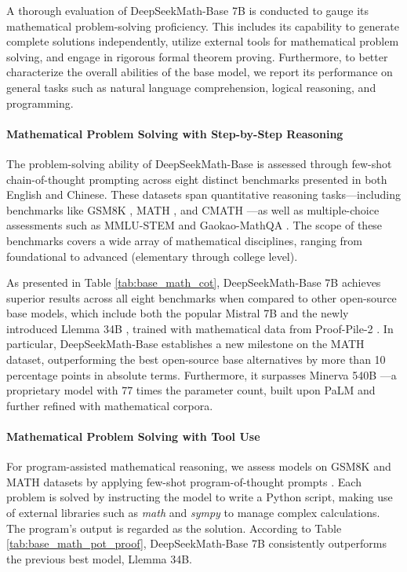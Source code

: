 A thorough evaluation of DeepSeekMath-Base 7B is conducted to gauge its mathematical problem-solving proficiency. This includes its capability to generate complete solutions independently, utilize external tools for mathematical problem solving, and engage in rigorous formal theorem proving. Furthermore, to better characterize the overall abilities of the base model, we report its performance on general tasks such as natural language comprehension, logical reasoning, and programming.

\paragraph{Mathematical Problem Solving with Step-by-Step Reasoning}

The problem-solving ability of DeepSeekMath-Base is assessed through few-shot chain-of-thought prompting \citep{cot} across eight distinct benchmarks presented in both English and Chinese. These datasets span quantitative reasoning tasks—including benchmarks like GSM8K \citep{gsm8k}, MATH \citep{MATH}, and CMATH \citep{wei2023cmath}—as well as multiple-choice assessments such as MMLU-STEM \citep{mmlu} and Gaokao-MathQA \citep{agieval}. The scope of these benchmarks covers a wide array of mathematical disciplines, ranging from foundational to advanced (elementary through college level).

As presented in Table \ref{tab:base_math_cot}, DeepSeekMath-Base 7B achieves superior results across all eight benchmarks when compared to other open-source base models, which include both the popular Mistral 7B \citep{mistral} and the newly introduced Llemma 34B \citep{llemma}, trained with mathematical data from Proof-Pile-2 \citep{llemma}. In particular, DeepSeekMath-Base establishes a new milestone on the MATH dataset, outperforming the best open-source base alternatives by more than 10 percentage points in absolute terms. Furthermore, it surpasses Minerva 540B \citep{minerva}—a proprietary model with 77 times the parameter count, built upon PaLM \citep{palm} and further refined with mathematical corpora.

\paragraph{Mathematical Problem Solving with Tool Use} For program-assisted mathematical reasoning, we assess models on GSM8K and MATH datasets by applying few-shot program-of-thought prompts \citep{pot,pal}. Each problem is solved by instructing the model to write a Python script, making use of external libraries such as \textit{math} and \textit{sympy} to manage complex calculations. The program's output is regarded as the solution. According to Table \ref{tab:base_math_pot_proof}, DeepSeekMath-Base 7B consistently outperforms the previous best model, Llemma 34B.

